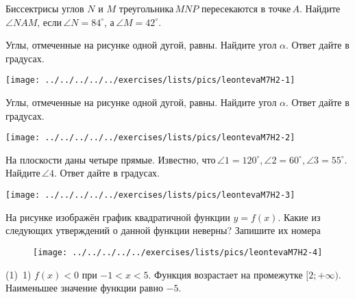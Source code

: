 \begin{homework}[number=2]
	\begin{listofex}
		\item Биссектрисы углов \( N \) и \( M \) треугольника \( MNP\) пересекаются в точке \( A \). Найдите \( \angle NAM \), если \( \angle N=84^{\circ }  \), а \( \angle M= 42^{\circ} \).
		\item
		\begin{minipage}[t]{\bodywidth}
			Углы, отмеченные на рисунке одной дугой, равны. Найдите угол \( \alpha \). Ответ дайте в градусах.
		\end{minipage}
		\hspace{0.02\linewidth}
		\begin{minipage}[t]{\picwidth}
			\texttt{[image: ../../../../../exercises/lists/pics/leontevaM7H2-1]}
		\end{minipage}
	\item
	\begin{minipage}[t]{\bodywidth}
		 Углы, отмеченные на рисунке одной дугой, равны. Найдите угол \( \alpha \). Ответ дайте в градусах.
	\end{minipage}
	\hspace{0.02\linewidth}
	\begin{minipage}[t]{\picwidth}
		\texttt{[image: ../../../../../exercises/lists/pics/leontevaM7H2-2]}
	\end{minipage}
	\item 
	\begin{minipage}[t]{\bodywidth}
		На плоскости даны четыре прямые. Известно, что \( \angle 1 = 120^{\circ} \), \( \angle 2 = 60^{\circ} \), \( \angle 3 = 55^{\circ} \). Найдите \( \angle 4 \). Ответ дайте в градусах.
	\end{minipage}
	\hspace{0.02\linewidth}
	\begin{minipage}[t]{\picwidth}
		\texttt{[image: ../../../../../exercises/lists/pics/leontevaM7H2-3]}
	\end{minipage}
	\item На рисунке изображён график квадратичной функции \( y  =  f(x) \).
	Какие из следующих утверждений о данной функции неверны? Запишите их номера
	\begin{figure}[h!]
		\centering
		\texttt{[image: ../../../../../exercises/lists/pics/leontevaM7H2-4]}
	\end{figure}
	\begin{tasks}(1)
		\task  1)  \( f(x)<0 \) при \( -1<x<5 \).
		\task Функция возрастает на промежутке \( [2; +\infty) \).
		\task Наименьшее значение функции равно \( -5 \).
	\end{tasks}
	\end{listofex}
\end{homework}

